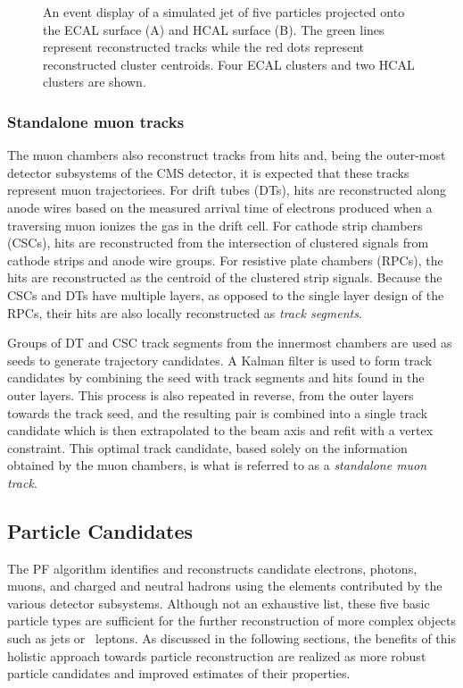 \begin{figure}[htbp]
{  }
  \caption[Event Display of Calorimeter Clusters]{An event display of a simulated jet of five particles projected onto the ECAL surface (A) and HCAL surface (B). The green lines represent reconstructed tracks while the red dots represent reconstructed cluster centroids. Four ECAL clusters and two HCAL clusters are shown.\cite{PARTICLEFLOW}}
    \label{fig:caloclusters}
\end{figure}

\subsubsection{Standalone muon tracks}\label{standalonemuontrack}

The muon chambers also reconstruct tracks from hits and, being the outer-most detector subsystems of the CMS detector, it is expected that these tracks represent muon trajectoriees. For drift tubes (DTs), hits are reconstructed along anode wires based on the measured arrival time of electrons produced when a traversing muon ionizes the gas in the drift cell. For cathode strip chambers (CSCs), hits are reconstructed from the intersection of clustered signals from cathode strips and anode wire groups. For resistive plate chambers (RPCs), the hits are reconstructed as the centroid of the clustered strip signals. Because the CSCs and DTs have multiple layers, as opposed to the single layer design of the RPCs, their hits are also locally reconstructed as \textit{track segments}.

Groups of DT and CSC track segments from the innermost chambers are used as seeds to generate trajectory candidates. A Kalman filter\cite{MUONKF} is used to form track candidates by combining the seed with track segments and hits found in the outer layers. This process is also repeated in reverse, from the outer layers towards the track seed, and the resulting pair is combined into a single track candidate which is then extrapolated to the beam axis and refit with a vertex constraint. This optimal track candidate, based solely on the information obtained by the muon chambers, is what is referred to as a \textit{standalone muon track}.

\subsection{Particle Candidates}

The PF algorithm identifies and reconstructs candidate electrons, photons, muons, and charged and neutral hadrons using the elements contributed by the various detector subsystems. Although not an exhaustive list, these five basic particle types are sufficient for the further reconstruction of more complex objects such as jets or \lept\ leptons. As discussed in the following sections, the benefits of this holistic approach towards particle reconstruction are realized as more robust particle candidates and improved estimates of their properties.

